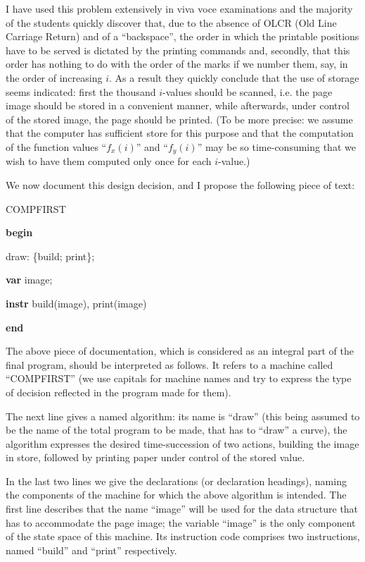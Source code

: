 I have used this problem extensively in viva voce examinations and the majority of the students quickly discover that, due to the absence of OLCR (Old Line Carriage Return) and of a ``backspace'', the order in which the printable positions have to be served is dictated by the printing commands and, secondly, that this order has nothing to do with the order of the marks if we number them, say, in the order of increasing $i$. As a result they quickly conclude that the use of storage seems indicated: first the thousand $i$-values should be scanned, i.e. the page image should be stored in a convenient manner, while afterwards, under control of the stored image, the page should be printed. (To be more precise: we assume that the computer has sufficient store for this purpose and that the computation of the function values ``$f_x(i)$'' and ``$f_y(i)$'' may be so time-consuming that we wish to have them computed only once for each $i$-value.)

We now document this design decision, and I propose the following piece of text:

COMPFIRST

\textbf{begin}

draw: \{build; print\};

\textbf{var} image;

\textbf{instr} build(image), print(image)

\textbf{end}

The above piece of documentation, which is considered as an integral part of the final program, should be interpreted as follows. It refers to a machine called ``COMPFIRST'' (we use capitals for machine names and try to express the type of decision reflected in the program made for them).

The next line gives a named algorithm: its name is ``draw'' (this being assumed to be the name of the total program to be made, that has to ``draw'' a curve), the algorithm expresses the desired time-succession of two actions, building the image in store, followed by printing paper under control of the stored value.

In the last two lines we give the declarations (or declaration headings), naming the components of the machine for which the above algorithm is intended. The first line describes that the name ``image'' will be used for the data structure that has to accommodate the page image; the variable ``image'' is the only component of the state space of this machine. Its instruction code comprises two instructions, named ``build'' and ``print'' respectively.

